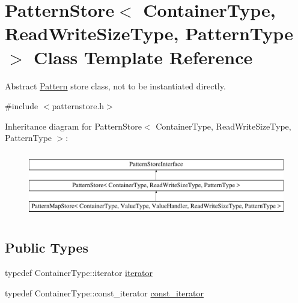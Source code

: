 \hypertarget{classPatternStore}{}\section{Pattern\+Store$<$ Container\+Type, Read\+Write\+Size\+Type, Pattern\+Type $>$ Class Template Reference}
\label{classPatternStore}


Abstract \hyperlink{classPattern}{Pattern} store class, not to be instantiated directly.  




{\ttfamily \#include $<$patternstore.\+h$>$}

Inheritance diagram for Pattern\+Store$<$ Container\+Type, Read\+Write\+Size\+Type, Pattern\+Type $>$\+:\begin{figure}[H]
\begin{center}
\leavevmode
\includegraphics[height=2.921739cm]{classPatternStore}
\end{center}
\end{figure}
\subsection*{Public Types}
\begin{DoxyCompactItemize}
\item 
typedef Container\+Type\+::iterator \hyperlink{classPatternStore_ac0c35c2f256738575a5fc6932546d9dc}{iterator}
\item 
typedef Container\+Type\+::const\+\_\+iterator \hyperlink{classPatternStore_a605a2f6e75381eac263bcc36976c1377}{const\+\_\+iterator}
\end{DoxyCompactItemize}
